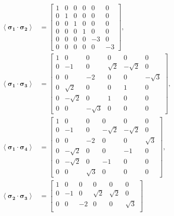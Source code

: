 \documentclass[prt,twocolumn,floatfix,nofootinbib]{revtex4}
\begin{document}
    \begin{align}
        \left\langle \boldsymbol{\sigma_{1}}\cdot \boldsymbol{\sigma_{2}} \right\rangle&=
        \begin{bmatrix}
            1 & 0 & 0 & 0 & 0 & 0 \\
            0 & 1 & 0 & 0 & 0 & 0 \\
            0 & 0 & 1 & 0 & 0 & 0 \\
            0 & 0 & 0 & 1 & 0 & 0 \\
            0 & 0 & 0 & 0 & -3 & 0 \\
            0 & 0 & 0 & 0 & 0 & -3
        \end{bmatrix}, \\
        \left\langle \boldsymbol{\sigma_{1}}\cdot \boldsymbol{\sigma_{3}} \right\rangle&=
        \begin{bmatrix}
            1 & 0 & 0 & 0 & 0 & 0 \\
            0 & -1 & 0 & \sqrt{2} & -\sqrt{2} & 0 \\
            0 & 0 & -2 & 0 & 0 & -\sqrt{3} \\
            0 & \sqrt{2} & 0 & 0 & 1 & 0 \\
            0 & -\sqrt{2} & 0 & 1 & 0 & 0 \\
            0 & 0 & -\sqrt{3} & 0 & 0 & 0
        \end{bmatrix}, \\
        \left\langle \boldsymbol{\sigma_{1}}\cdot \boldsymbol{\sigma_{4}} \right\rangle&=
        \begin{bmatrix}
            1 & 0 & 0 & 0 & 0 & 0 \\
            0 & -1 & 0 & -\sqrt{2} & -\sqrt{2} & 0 \\
            0 & 0 & -2 & 0 & 0 & \sqrt{3} \\
            0 & -\sqrt{2} & 0 & 0 & -1 & 0 \\
            0 & -\sqrt{2} & 0 & -1 & 0 & 0 \\
            0 & 0 & \sqrt{3} & 0 & 0 & 0
        \end{bmatrix}, \\
        \left\langle \boldsymbol{\sigma_{2}}\cdot \boldsymbol{\sigma_{3}} \right\rangle&=
        \begin{bmatrix}
            1 & 0 & 0 & 0 & 0 & 0 \\
            0 & -1 & 0 & \sqrt{2} & \sqrt{2} & 0 \\
            0 & 0 & -2 & 0 & 0 & \sqrt{3} \\

\end{bmatrix}
\end{align}
\end{document}
